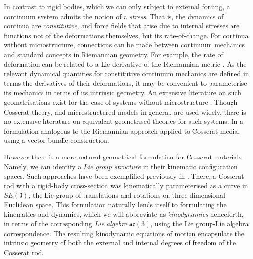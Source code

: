 \documentclass[]{cam-thesis}
\begin{document}
In contrast to rigid bodies, which we can only subject to external forcing, a continuum system admits the notion of a \textit{stress}. That is, the dynamics of continua are \textit{constitutive}, and force fields that arise due to internal stresses are functions not of the deformations themselves, but its rate-of-change. For continua without microstructure, connections can be made between continuum mechanics and standard concepts in Riemannian geometry. For example, the rate of deformation can be related to a Lie derivative of the Riemannian metric \citep{marsdenMathematicalFoundationsElasticity1994}. As the relevant dynamical quantities for constitutive continuum mechanics are defined in terms the derivatives of their deformations, it may be convenient to parameterise its mechanics in terms of its intrinsic geometry. An extensive literature on such geometrisations exist for the case of systems without microstructure \citep{marsdenMathematicalFoundationsElasticity1994, wangIntroductionRationalElasticity1973, wangGeometricStructuresSimple1967, greenMechanicsNonlinearMaterials1957, lublinerMethodVirtualPower, nollMathematicalTheoryMechanical1958}. Though Cosserat theory, and microstructured models in general, are used widely, there is no extensive literature on equivalent geometrised theories for such systems. In \citep{yamaokaContinuumDynamicsVector2010} a formulation analogous to the Riemannian approach applied to Cosserat media, using a vector bundle construction.

However there is a more natural geometrical formulation for Cosserat materials. Namely, we can identify a \textit{Lie group structure} in their kinematic configuration spaces. Such approaches have been exemplified previously in \citep{giusteriSimulationViscoelasticCosserat2021, giusteriImportanceEffectivenessRepresenting, chirikjianStochasticElasticaExcludedVolume2008, holmMatrixGstrands2014}. There, a Cosserat rod with a rigid-body cross-section was kinematically parameterised as a curve in $SE(3)$, the Lie group of translations and rotations on three-dimensional Euclidean space. This formulation naturally lends itself to formulating the kinematics and dynamics, which we will abbreviate as \textit{kinodynamics} \citep{donaldKinodynamicMotionPlanning1993, donaldProvablyGoodApproximation1995} henceforth, in terms of the corresponding \textit{Lie algebra} $\mathfrak{se}(3)$, using the Lie group-Lie algebra correspondence. The resulting kinodynamic equations of motion encapsulate the intrinsic geometry of both the external and internal degrees of freedom of the Cosserat rod.
\end{document}
